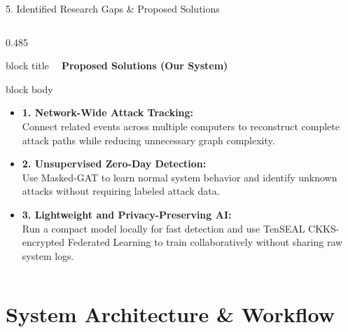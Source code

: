 \documentclass[aspectratio=169,10pt]{beamer}
\begin{document}
\begin{frame}[t]{5. Identified Research Gaps \& Proposed Solutions}
\begin{columns}[T]
\begin{column}{0.485\textwidth}
\begin{beamercolorbox}[rounded=true,shadow=false,sep=0.32em,wd=\linewidth]{block title}
\textbf{\scriptsize \textcolor{strengthGreen}{\textbullet\ } Proposed Solutions (Our System)}
\end{beamercolorbox}
\vspace{0.1em}
\begin{beamercolorbox}[rounded=true,shadow=false,sep=0.40em,wd=\linewidth]{block body}
{\fontsize{7.0pt}{9.6pt}\selectfont
\begin{itemize}\itemsep0.48em
  \item \textbf{1. Network-Wide Attack Tracking:}\\
  Connect related events across multiple computers to reconstruct complete attack paths while reducing unnecessary graph complexity.
  
  \item \textbf{2. Unsupervised Zero-Day Detection:}\\
  Use Masked-GAT to learn normal system behavior and identify unknown attacks without requiring labeled attack data.
  
  \item \textbf{3. Lightweight and Privacy-Preserving AI:}\\
  Run a compact model locally for fast detection and use TenSEAL CKKS-encrypted Federated Learning to train collaboratively without sharing raw system logs.
\end{itemize}
}
\end{beamercolorbox}
\end{column}
\end{columns}
\end{frame}



\section{System Architecture \& Workflow}
\end{document}
